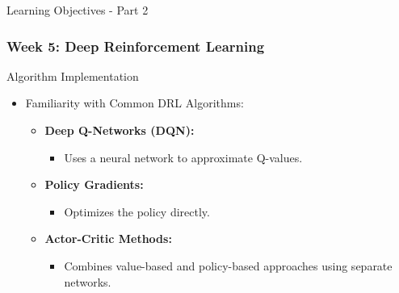 \documentclass[aspectratio=169]{beamer}
\begin{document}
\begin{frame}[fragile]{Learning Objectives - Part 2}
    \frametitle{Week 5: Deep Reinforcement Learning}
    
    \begin{block}{Algorithm Implementation}
        \begin{itemize}
            \item Familiarity with Common DRL Algorithms:
                \begin{itemize}
                    \item \textbf{Deep Q-Networks (DQN):} 
                        \begin{itemize}
                            \item Uses a neural network to approximate Q-values.
                        \end{itemize}
                    \item \textbf{Policy Gradients:} 
                        \begin{itemize}
                            \item Optimizes the policy directly.
                        \end{itemize}
                    \item \textbf{Actor-Critic Methods:} 
                        \begin{itemize}
                            \item Combines value-based and policy-based approaches using separate networks.
                        \end{itemize}
                \end{itemize}
        \end{itemize}
    \end{block}
\end{frame}
\end{document}
